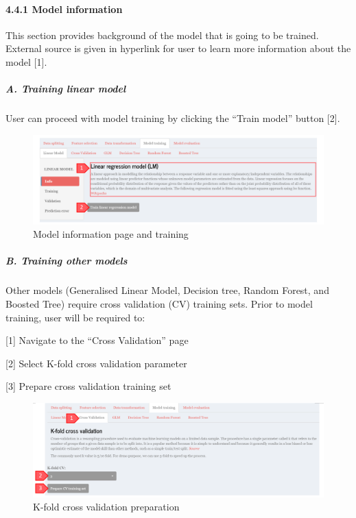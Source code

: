 \documentclass[
  12pt,
]{article}
\begin{document}
\hypertarget{model-information}{%
\paragraph{4.4.1 Model information}\label{model-information}}

This section provides background of the model that is going to be
trained. External source is given in hyperlink for user to learn more
information about the model {[}1{]}.

\hypertarget{a.-training-linear-model}{%
\subparagraph{A. Training linear model}\label{a.-training-linear-model}}

User can proceed with model training by clicking the ``Train model''
button {[}2{]}.

\begin{figure}[H]

{\centering \includegraphics[width=0.95\linewidth]{images/mdltrain1} 

}

\caption{Model information page and training}\label{fig:unnamed-chunk-25}
\end{figure}

\hypertarget{b.-training-other-models}{%
\subparagraph{B. Training other models}\label{b.-training-other-models}}

Other models (Generalised Linear Model, Decision tree, Random Forest,
and Boosted Tree) require cross validation (CV) training sets. Prior to
model training, user will be required to:

{[}1{]} Navigate to the ``Cross Validation'' page

{[}2{]} Select K-fold cross validation parameter

{[}3{]} Prepare cross validation training set

\begin{figure}[H]

{\centering \includegraphics[width=0.95\linewidth]{images/kfold} 

}

\caption{K-fold cross validation preparation}\label{fig:unnamed-chunk-26}
\end{figure}
\end{document}
